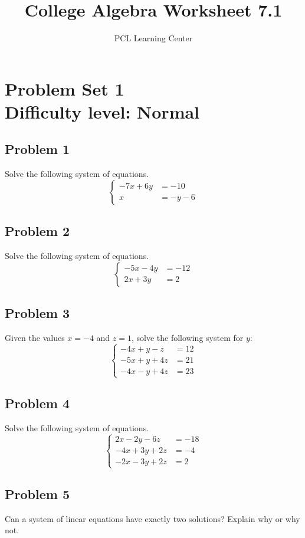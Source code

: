 \documentclass[12pt]{article}
\title{College Algebra Worksheet 7.1}
\author{PCL Learning Center}
\date{}
\begin{document}
\maketitle

\section*{Problem Set 1\\Difficulty level: Normal}
\subsection*{Problem 1}
Solve the following system of equations.
\[
\left\{\begin{aligned}
-7x + 6y &= -10\\[6pt]
x &= -y - 6
\end{aligned}\right.
\]

\subsection*{Problem 2}
Solve the following system of equations.
\[
\left\{\begin{aligned}
-5x - 4y &= -12\\[6pt]
2x + 3y &= 2
\end{aligned}\right.
\]

\subsection*{Problem 3}
Given the values \(x=-4\) and \(z=1\), solve the following system for \(y\):
\[
\left\{\begin{aligned}
-4x + y - z &= 12\\[6pt]
-5x + y + 4z &= 21\\[6pt]
-4x - y + 4z &= 23
\end{aligned}\right.
\]

\subsection*{Problem 4}
Solve the following system of equations.
\[
\left\{\begin{aligned}
2x - 2y - 6z &= -18\\[6pt]
-4x + 3y + 2z &= -4\\[6pt]
-2x - 3y + 2z &= 2
\end{aligned}\right.
\]

\subsection*{Problem 5}
Can a system of linear equations have exactly two solutions? Explain why or why not.
\end{document}
